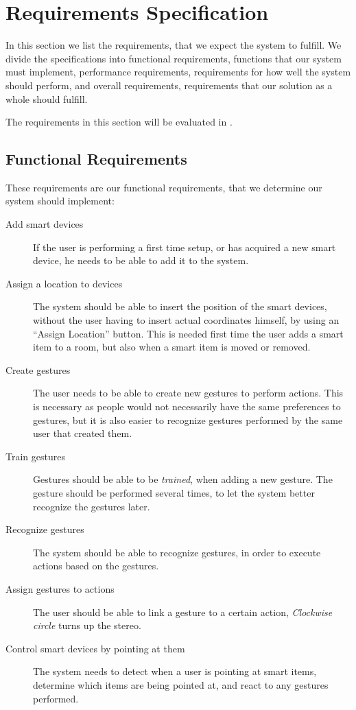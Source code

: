\section{Requirements Specification}
\label{sec:requirements-specification}

In this section we list the requirements, 
that we expect the system to fulfill.
We divide the specifications into functional requirements, 
\ie functions that our system must implement,
performance requirements,
\ie requirements for how well the system should perform,
and overall requirements, 
\ie requirements that our solution as a whole should fulfill.

The requirements in this section will be evaluated in .

\subsection{Functional Requirements}
These requirements are our functional requirements, 
that we determine our system should implement:
\begin{description}
    \item[Add smart devices] If the user is performing a first time setup, or has acquired a new smart device, he needs to be able to add it to the system. 
    \item[Assign a location to devices] The system should be able to insert the position of the smart devices, without the user having to insert actual coordinates himself, \eg by using an ``Assign Location'' button. This is needed first time the user adds a smart item to a room, but also when a smart item is moved or removed.
    \item[Create gestures] The user needs to be able to create new gestures to perform actions. This is necessary as people would not necessarily have the same preferences to gestures, but it is also easier to recognize gestures performed by the same user that created them.
    \item[Train gestures] Gestures should be able to be \emph{trained}, \ie when adding a new gesture. The gesture should be performed several times, to let the system better recognize the gestures later.  
    \item[Recognize gestures] The system should be able to recognize gestures, in order to execute actions based on the gestures.
    \item[Assign gestures to actions] The user should be able to link a gesture to a certain action, \eg \textit{Clockwise circle} turns up the stereo.
    \item[Control smart devices by pointing at them] The system needs to detect when a user is pointing at smart items, determine which items are being pointed at, and react to any gestures performed.
\end{description}

